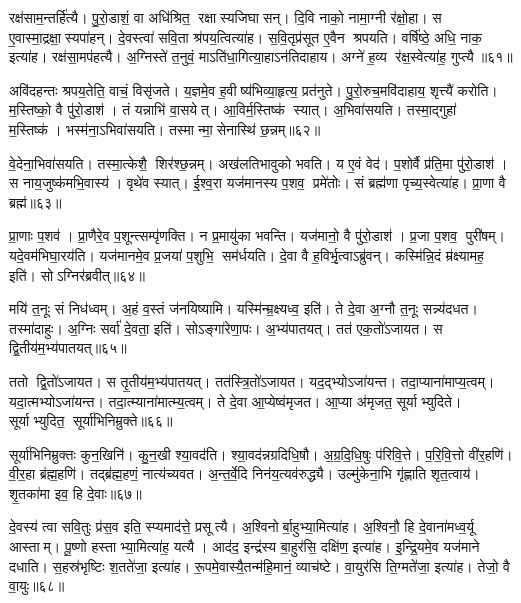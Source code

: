 रक्ष॑साम॒न्तर्\mbox{}हि॑त्यै।
पु॒रो॒डाशं॒ वा अधि॑श्रित॒ रक्षास्यजिघासन्।
दि॒वि नाको॒ नामा॒ग्नी र॑क्षो॒हा।
स ए॒वास्मा॒द्रक्षा॒स्यपा॑हन्।
दे॒वस्त्वा॑ सवि॒ता श्र॑पय॒त्वित्या॑ह।
स॒वि॒तृप्र॑सूत ए॒वैन श्रपयति।
वर्\mbox{}षि॑ष्ठे॒ अधि॒ नाक॒ इत्या॑ह।
रक्ष॑सा॒मप॑हत्यै।
अ॒ग्निस्ते॑ त॒नुवं॒ माऽति॑धा॒गित्या॒हाऽन॑तिदाहाय।
अग्ने॑ ह॒व्य र॑क्ष॒स्वेत्या॑ह॒ गुप्त्यै॥६१॥

अवि॑दहन्तः श्रपय॒तेति॒ वाचं॒ विसृ॑जते।
य॒ज्ञमे॒व ह॒वीष्य॑भिव्या॒हृत्य॒ प्रत॑नुते।
पु॒रो॒रुच॒मवि॑दाहाय॒ शृत्त्यै॑ करोति।
म॒स्तिष्को॒ वै पु॑रो॒डाश॑।
तं यन्नाभि॑ वा॒सयेत्।
आ॒विर्म॒स्तिष्क॑ स्यात्।
अ॒भिवा॑सयति।
तस्मा॒द्गुहा॑ म॒स्तिष्क॑।
भस्म॑ना॒ऽभिवा॑सयति।
तस्मान्मा॒सेनास्थि॑ छ॒न्नम्॥६२॥

वे॒देना॒भिवा॑सयति।
तस्मा॒त्केशै॒ शिर॑श्छ॒न्नम्।
अख॑लतिभावुको भवति।
य ए॒वं वेद॑।
प॒शोर्वै प्र॑ति॒मा पु॑रो॒डाश॑।
स नाय॒जुष्क॑मभि॒वास्य॑।
वृथे॑व स्यात्।
ई॒श्व॒रा यज॑मानस्य प॒शव॒ प्रमे॑तोः।
सं ब्रह्म॑णा पृच्य॒स्वेत्या॑ह।
प्रा॒णा वै ब्रह्म॑॥६३॥

प्रा॒णाः प॒शव॑।
प्रा॒णैरे॒व प॒शून्त्सम्पृ॑णक्ति।
न प्र॒मायु॑का भवन्ति।
यज॑मानो॒ वै पु॑रो॒डाश॑।
प्र॒जा प॒शव॒ पुरी॑षम्।
यदे॒वम॑भिघा॒रय॑ति।
यज॑मानमे॒व प्र॒जया॑ प॒शुभि॒ सम॑र्धयति।
दे॒वा वै ह॒विर्भृ॒त्वाऽब्रु॑वन्।
कस्मि॑न्नि॒दं म्र॑क्ष्यामह॒ इति॑।
सोऽग्निर॑ब्रवीत्॥६४॥

मयि॑ त॒नूः सं निध॑ध्वम्।
अ॒हं व॒स्तं ज॑नयिष्यामि।
यस्मि॑न्म्र॒क्ष्यध्व॒ इति॑।
ते दे॒वा अ॒ग्नौ त॒नूः सन्न्य॑दधत।
तस्मा॑दाहुः।
अ॒ग्निः सर्वा॑ दे॒वता॒ इति॑।
सोऽङ्गा॑रेणा॒पः।
अ॒भ्य॑पातयत्।
तत॑ एक॒तो॑ऽजायत।
स द्वि॒तीय॑म॒भ्य॑पातयत्॥६५॥

ततो द्वि॒तो॑ऽजायत।
स तृ॒तीय॑म॒भ्य॑पातयत्।
तत॑स्त्रि॒तो॑ऽजायत।
यद॒द्भ्योऽजा॑यन्त।
तदा॒प्याना॑माप्य॒त्वम्।
यदा॒त्मभ्योऽजा॑यन्त।
तदा॒त्म्याना॑मात्म्य॒त्वम्।
ते दे॒वा आ॒प्येष्व॑मृजत।
आ॒प्या अ॑मृजत॒ सूर्याभ्युदिते।
सूर्याभ्युदित॒ सूर्या॑भिनिम्रुक्ते॥६६॥

सूर्या॑भिनिम्रुक्तः कुन॒खिनि॑।
कु॒न॒खी श्या॒वद॑ति।
श्या॒वद॑न्नग्रदिधि॒षौ।
अ॒ग्र॒दि॒धि॒षुः प॑रिवि॒त्ते।
प॒रि॒वि॒त्तो वी॑र॒हणि॑।
वी॒र॒हा ब्र॑ह्म॒हणि॑।
तद्ब्र॑ह्म॒हणं॒ नात्य॑च्यवत।
अ॒न्त॒र्वे॒दि निन॑य॒त्यव॑रुद्ध्यै।
उल्मु॑केना॒भि गृ॑ह्णाति शृत॒त्वाय॑।
शृ॒तका॑मा इव॒ हि दे॒वाः॥६७॥\anuvakamend[अ॒न्या जि॑न्वन्त्यनु वि॒सृत्यै॒वमा॒हाशान्त आह॒ गुप्त्यै॑ छ॒न्नं ब्रह्माब्रवीद्द्वि॒तीय॑म॒भ्य॑पातय॒त्सूर्या॑भिनिम्रुक्ते दे॒वाः]

दे॒वस्य॑ त्वा सवि॒तुः प्र॑स॒व इति॒ स्प्यमाद॑त्ते॒ प्रसूत्यै।
अ॒श्विनोर्बा॒हुभ्या॒मित्या॑ह।
अ॒श्विनौ॒ हि दे॒वाना॑मध्व॒र्यू आस्ताम्।
पू॒ष्णो हस्ताभ्या॒मित्या॑ह॒ यत्यै।
आद॑द॒ इन्द्र॑स्य बा॒हुर॑सि॒ दक्षि॑ण॒ इत्या॑ह।
इ॒न्द्रि॒यमे॒व यज॑माने दधाति।
स॒हस्र॑भृष्टिः श॒तते॑जा॒ इत्या॑ह।
रू॒पमे॒वास्यै॒तन्म॑हि॒मानं॒ व्याच॑ष्टे।
वा॒युर॑सि ति॒ग्मते॑जा॒ इत्या॑ह।
तेजो॒ वै वा॒युः॥६८॥

